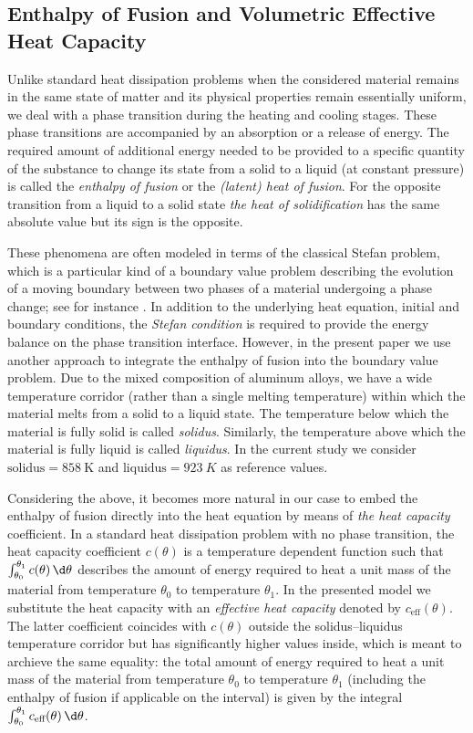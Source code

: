 \subsection{Enthalpy of Fusion and Volumetric Effective Heat Capacity}
\label{subsec:capacity}

Unlike standard heat dissipation problems when the considered material remains in the same state of matter and its physical properties remain essentially uniform, we deal with a phase transition during the heating and cooling stages. 
These phase transitions are accompanied by an absorption or a release of energy. 
The required amount of additional energy needed to be provided to a specific quantity of the substance to change its state from a solid to a liquid (at constant pressure) is called the \emph{enthalpy of fusion} or the \emph{(latent) heat of fusion}. 
For the opposite transition from a liquid to a solid state \emph{the heat of solidification} has the same absolute value but its sign is the opposite.

These phenomena are often modeled in terms of the classical Stefan problem, which is a particular kind of a boundary value problem describing the evolution of a moving boundary between two phases of a material undergoing a phase change; see for instance \cite{Gupta:2003:1}. 
In addition to the underlying heat equation, initial and boundary conditions, the \emph{Stefan condition} is required to provide the energy balance on the phase transition interface.
However, in the present paper we use another approach to integrate the enthalpy of fusion into the boundary value problem. 
Due to the mixed composition of aluminum alloys, we have a wide temperature corridor (rather than a single melting temperature) within which the material melts from a solid to a liquid state. 
The temperature below which the material is fully solid is called \emph{solidus}. 
Similarly, the temperature above which the material is fully liquid is called \emph{liquidus}. 
In the current study we consider $\text{solidus} = \SI{858}{\K}$ and $\text{liquidus} = \SI{923}{K}$ as reference values.

Considering the above, it becomes more natural in our case to embed the enthalpy of fusion directly into the heat equation by means of \emph{the heat capacity} coefficient. 
In a standard heat dissipation problem with no phase transition, the heat capacity coefficient $c(\theta)$ is a temperature dependent function such that $\int_{\theta_0}^{\theta_1} c(\theta) \, \d\theta$ describes the amount of energy required to heat a unit mass of the material from temperature $\theta_0$ to temperature $\theta_1$. 
In the presented model we substitute the heat capacity with an \emph{effective heat capacity} denoted by $c_{\text{eff}}(\theta)$. 
The latter coefficient coincides with $c(\theta)$ outside the solidus--liquidus temperature corridor but has significantly higher values inside, which is meant to archieve the same equality: the total amount of energy required to heat a unit mass of the material from temperature $\theta_0$ to temperature $\theta_1$ (including the enthalpy of fusion if applicable on the interval) is given by the integral $\int_{\theta_0}^{\theta_1} c_{\text{eff}}(\theta) \, \d\theta$.

